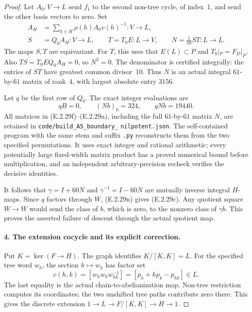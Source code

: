 \begin{proof}
Let \(A_0:V\to L\) send \(f_1\) to the second non-tree
cycle, of index~1, and send the other basis vectors to zero.
Set
\[
 \begin{aligned}
 A_H&=\sum_{h\in H}\rho(h)A_0v(h)^{-1}:V\longrightarrow L,\\
 S&=Q_0A_H:V\longrightarrow L,\qquad
 T=T_0E:L\longrightarrow V,\qquad
 N=\frac1{10}ST:L\longrightarrow L .
 \end{aligned}
 \tag{E.2.29m}
\]
The maps \(S,T\) are equivariant. For \(T\), this uses
that \(E(L)\subset P\) and \(T_0|_P=F_D|_P\).
Also \(TS=T_0EQ_0A_H=0\), so \(N^2=0\).
The denominator is certified integrally: the entries of
\(ST\) have greatest common divisor~10. Thus \(N\) is
an actual integral \(61\)-by-\(61\) matrix of rank~4,
with largest absolute entry \(3156\).

Let \(q\) be the first row of \(Q_0\). The exact
integer evaluations are
\[
 qB=0,\qquad (Nb)_0=324,\qquad qNb=19440 .
 \tag{E.2.29n}
\]
All matrices in (E.2.29f)--(E.2.29n), including the full
\(61\)-by-\(61\) matrix \(N\), are retained in
\texttt{code/build\_A5\_boundary\_}\allowbreak
\texttt{nilpotent.json}. The self-contained program with
the same stem and suffix \texttt{.py} reconstructs them
from the two specified permutations. It uses exact
integer and rational arithmetic; every potentially large
fixed-width matrix product has a proved numerical bound
before multiplication, and an independent arbitrary-precision
recheck verifies the decisive identities.

It follows that
\(\gamma=I+60N\) and \(\gamma^{-1}=I-60N\)
are mutually inverse integral \(H\)-maps. Since \(q\)
factors through \(W\), (E.2.29n) gives (E.2.29c).
Any quotient square \(W\to W\) would send the class of
\(b\), which is zero, to the nonzero class of \(\gamma b\).
This proves the asserted failure of descent through the
actual quotient map.

\paragraph{4. The extension cocycle and its explicit correction.}
Put \(K=\ker(F\to H)\). The graph identifies
\(K/[K,K]=L\). For the specified tree word \(w_h\),
the section \(h\mapsto w_h\) has factor set
\[
 c(h,k)=[w_hw_kw_{hk}^{-1}]
       =[p_h+h p_k-p_{hk}]\in L.
 \tag{E.2.29o}
\]
The last equality is the actual chain-to-abelianization
map. Non-tree restriction computes its coordinates; the
two unshifted tree paths contribute zero there.
This gives the discrete extension
\(1\to L\to F/[K,K]\to H\to1\).


\end{proof}
